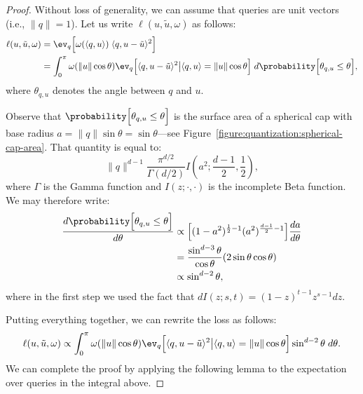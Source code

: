 \begin{proof}
Without loss of generality, we can assume that queries are unit vectors (i.e., $\lVert q \rVert = 1$).
Let us write $\ell(u, \tilde{u}, \omega)$ as follows:
\begin{align*}
    \ell(u, \tilde{u}, \omega) &= \ev_q \Big[ \omega(\langle q, u \rangle) \; \langle q, u - \tilde{u} \rangle^2 \Big] \\
    &= \int_0^\pi \omega(\lVert u \rVert \cos \theta) \ev_q \Big[ \langle q, u - \tilde{u} \rangle^2 \big| \langle q, u \rangle = \lVert u \rVert \cos \theta \Big] \; d \probability\Big[ \theta_{q,u} \leq \theta \Big],
\end{align*}
where $\theta_{q, u}$ denotes the angle between $q$ and $u$.

Observe that
$\probability\Big[ \theta_{q,u} \leq \theta \Big]$ is the surface area of a spherical cap with base radius
$a = \lVert q \rVert \sin \theta = \sin \theta$---see Figure~\ref{figure:quantization:spherical-cap-area}.
That quantity is equal to:
\begin{equation*}
    \lVert q \rVert^{d - 1} \frac{\pi^{d/2}}{\Gamma(d/2)} I(a^2; \frac{d-1}{2}, \frac{1}{2}),
\end{equation*}
where $\Gamma$ is the Gamma function and $I(z; \cdot, \cdot)$ is the incomplete Beta function.
We may therefore write:
\begin{align*}
    \frac{d \probability\Big[ \theta_{q,u} \leq \theta \Big]}{d \theta} &\propto \Big[ (1 - a^2)^{\frac{1}{2} - 1} (a^2)^{\frac{d - 1}{2} - 1} \Big] \frac{d a}{d \theta} \\
    &= \frac{\sin^{d-3} \theta}{\cos \theta} (2 \sin \theta \cos \theta) \\
    &\propto \sin^{d-2} \theta,
\end{align*}
where in the first step we used the fact that $d I(z; s, t) = (1 - z)^{t - 1} z^{s-1} dz$.

Putting everything together, we can rewrite the loss as follows:
\begin{equation*}
    \ell(u, \tilde{u}, \omega) \propto \int_0^\pi \omega(\lVert u \rVert \cos \theta) \ev_q \Big[ \langle q, u - \tilde{u} \rangle^2 \big| \langle q, u \rangle = \lVert u \rVert \cos \theta \Big] \sin^{d-2}\theta \; d\theta.
\end{equation*}
We can complete the proof by applying the following lemma to the expectation over queries in the integral
above.


\end{proof}
